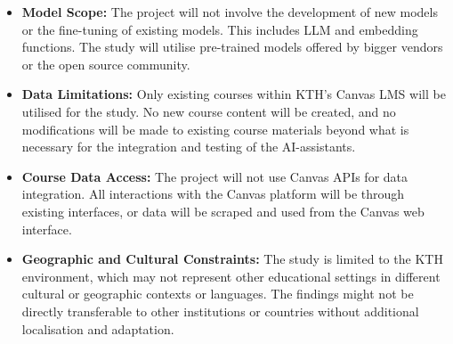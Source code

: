 \begin{itemize}
        \item \textbf{Model Scope:} The project will not involve the development of new models or the fine-tuning of existing models. This includes \gls{LLM} and embedding functions. The study will utilise pre-trained models offered by bigger vendors or the open source community.
        \item \textbf{Data Limitations:} Only existing courses within KTH's Canvas \gls{LMS} will be utilised for the study. No new course content will be created, and no modifications will be made to existing course materials beyond what is necessary for the integration and testing of the AI-assistants.
        \item \textbf{Course Data Access:} The project will not use Canvas APIs for data integration. All interactions with the Canvas platform will be through existing interfaces, or data will be scraped and used from the Canvas web interface.
        \item \textbf{Geographic and Cultural Constraints:} The study is limited to the KTH environment, which may not represent other educational settings in different cultural or geographic contexts or languages. The findings might not be directly transferable to other institutions or countries without additional localisation and adaptation.
\end{itemize}








\cleardoublepage